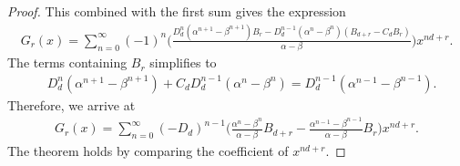 \documentclass[10pt,a4paper]{amsart}
\begin{document}
\begin{proof}
This combined with the first sum gives the expression
\begin{align*}
	G_r (x) = \sum_{n = 0}^\infty (-1)^n \bigg( \frac{D_d^n (\alpha^{n + 1} - \beta^{n + 1}) B_r - D_d^{n - 1} (\alpha^n - \beta^n) (B_{d + r} - C_d B_r)}{\alpha - \beta} \bigg) x^{nd + r}.
\end{align*}
The terms containing $ B_r $ simplifies to
\begin{align*}
	&D_d^n (\alpha^{n + 1} - \beta^{n + 1}) + C_d D_d^{n - 1} (\alpha^n - \beta^n) = D_d^{n - 1} (\alpha^{n - 1} - \beta^{n - 1}).
\end{align*}
Therefore, we arrive at
\begin{align*}
	G_r (x) = \sum_{n = 0}^\infty (-D_d)^{n - 1} \bigg( \frac{\alpha^n - \beta^n}{\alpha - \beta} B_{d + r} - \frac{\alpha^{n - 1} - \beta^{n - 1}}{\alpha - \beta} B_r \bigg) x^{nd + r}.
\end{align*}
The theorem holds by comparing the coefficient of $ x^{nd + r} $.
\end{proof}
\end{document}
